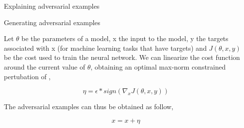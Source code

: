 \begin{tframe}{Explaining adversarial examples}



\end{tframe}


\begin{tframe}{Generating adversarial examples}

Let $\theta$ be the parameters of a model, x the input to the model, y the targets associated with x (for machine learning tasks that have targets) and $J(\theta, x, y)$ be the cost used to train the neural network. 
We can linearize the cost function around the current value of $\theta$, obtaining an optimal max-norm constrained pertubation of ,

$$ \eta = \epsilon * sign(\nabla_x J(\theta, x, y)) $$

The adversarial examples can thus be obtained as follow,

$$ x = x + \eta $$


\end{tframe}